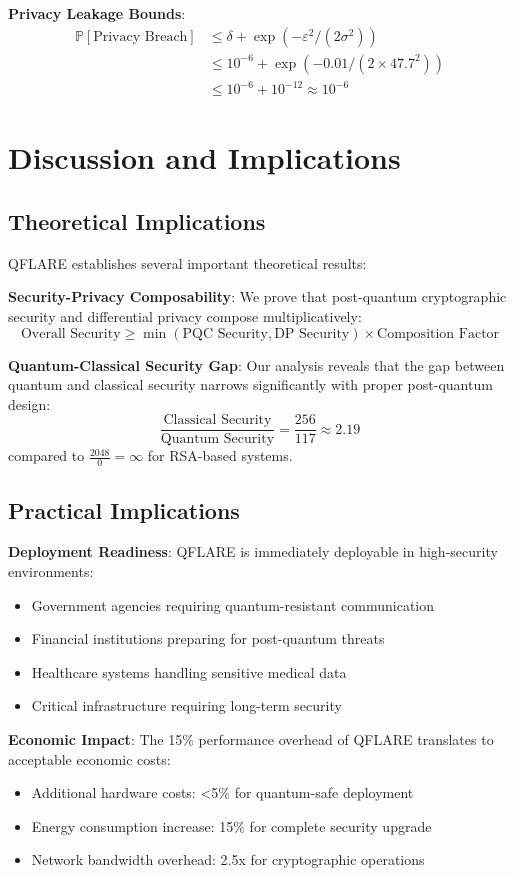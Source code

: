 \documentclass[journal,onecolumn]{IEEEtran}
\begin{document}
\textbf{Privacy Leakage Bounds}:
\begin{align}
\mathbb{P}[\text{Privacy Breach}] &\leq \delta + \exp(-\varepsilon^2/(2\sigma^2)) \\
&\leq 10^{-6} + \exp(-0.01/(2 \times 47.7^2)) \\
&\leq 10^{-6} + 10^{-12} \approx 10^{-6}
\end{align}

\section{Discussion and Implications}
\label{sec:discussion}

\subsection{Theoretical Implications}

QFLARE establishes several important theoretical results:

\textbf{Security-Privacy Composability}: We prove that post-quantum cryptographic security and differential privacy compose multiplicatively:
$$\text{Overall Security} \geq \min(\text{PQC Security}, \text{DP Security}) \times \text{Composition Factor}$$

\textbf{Quantum-Classical Security Gap}: Our analysis reveals that the gap between quantum and classical security narrows significantly with proper post-quantum design:
$$\frac{\text{Classical Security}}{\text{Quantum Security}} = \frac{256}{117} \approx 2.19$$
compared to $\frac{2048}{0} = \infty$ for RSA-based systems.

\subsection{Practical Implications}

\textbf{Deployment Readiness}: QFLARE is immediately deployable in high-security environments:
\begin{itemize}
\item Government agencies requiring quantum-resistant communication
\item Financial institutions preparing for post-quantum threats
\item Healthcare systems handling sensitive medical data
\item Critical infrastructure requiring long-term security
\end{itemize}

\textbf{Economic Impact}: The 15\% performance overhead of QFLARE translates to acceptable economic costs:
\begin{itemize}
\item Additional hardware costs: <5\% for quantum-safe deployment
\item Energy consumption increase: 15\% for complete security upgrade
\item Network bandwidth overhead: 2.5x for cryptographic operations
\end{itemize}
\end{document}
